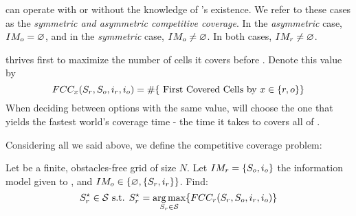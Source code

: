 \opp can operate with or without the knowledge of \rob's existence. We refer to these cases as the {\em symmetric and asymmetric competitive coverage}.
In the {\em asymmetric} case, $IM_o=\varnothing$, and in the {\em symmetric} case, $IM_o \neq \varnothing$. In both cases, $IM_r \neq \varnothing $.

\rob thrives first to maximize the number of cells it covers before \opp. Denote this value by 
\begin{dmath*}[compact]
\fcc_{x}(S_\rob, S_\opp, i_\rob, i_\opp )= 
\# \lbrace \textnormal{ First Covered Cells by } x \in \lbrace\rob,\opp\rbrace \rbrace 
\end{dmath*}
When deciding between options with the same \fcc value, \rob will choose the one that yields the fastest world's coverage time - the time it takes \rob to covers all of \w.

Considering all we said above, we define the competitive coverage problem:
\begin{mdframed}[backgroundcolor=gray!20] 
\begin{definition}
Let \w be a finite, obstacles-free grid of size $N$. Let $IM_r=\lbrace S_o ,i_o \rbrace$ the information model given to \rob, and $IM_o \in \lbrace \varnothing, \lbrace S_r, i_r \rbrace \rbrace$. Find:
\begin{dmath*}[compact]
S_\rob^\star \in \mathcal{S} \textnormal{ s.t. } S_\rob^\star =\argmax_{S_\rob\in\mathcal{S}} \lbrace \fcc_{r}(S_\rob, S_\opp, i_\rob, i_\opp ) \rbrace
\end{dmath*}
\end{definition}
\end{mdframed}
